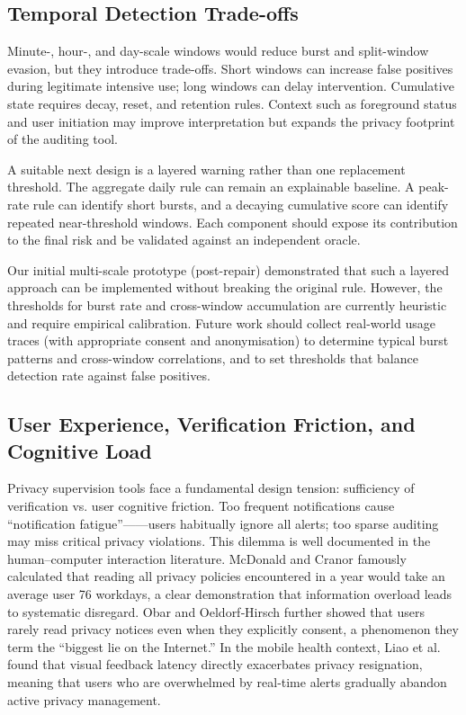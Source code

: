 \subsection{Temporal Detection Trade-offs}

Minute-, hour-, and day-scale windows would reduce burst and split-window evasion, but they introduce trade-offs. Short windows can increase false positives during legitimate intensive use; long windows can delay intervention. Cumulative state requires decay, reset, and retention rules. Context such as foreground status and user initiation may improve interpretation but expands the privacy footprint of the auditing tool.

A suitable next design is a layered warning rather than one replacement threshold. The aggregate daily rule can remain an explainable baseline. A peak-rate rule can identify short bursts, and a decaying cumulative score can identify repeated near-threshold windows. Each component should expose its contribution to the final risk and be validated against an independent oracle.

Our initial multi-scale prototype (post-repair) demonstrated that such a layered approach can be implemented without breaking the original rule. However, the thresholds for burst rate and cross-window accumulation are currently heuristic and require empirical calibration. Future work should collect real-world usage traces (with appropriate consent and anonymisation) to determine typical burst patterns and cross-window correlations, and to set thresholds that balance detection rate against false positives.

\subsection{User Experience, Verification Friction, and Cognitive Load}

Privacy supervision tools face a fundamental design tension: sufficiency of verification vs. user cognitive friction. Too frequent notifications cause ``notification fatigue''——users habitually ignore all alerts; too sparse auditing may miss critical privacy violations. This dilemma is well documented in the human–computer interaction literature. McDonald and Cranor \cite{12} famously calculated that reading all privacy policies encountered in a year would take an average user 76 workdays, a clear demonstration that information overload leads to systematic disregard. Obar and Oeldorf‐Hirsch \cite{13} further showed that users rarely read privacy notices even when they explicitly consent, a phenomenon they term the ``biggest lie on the Internet.'' In the mobile health context, Liao et al. \cite{14} found that visual feedback latency directly exacerbates privacy resignation, meaning that users who are overwhelmed by real‑time alerts gradually abandon active privacy management.

